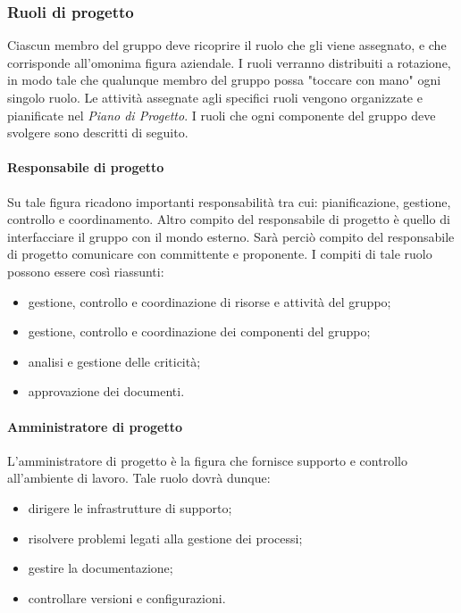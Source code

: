 		\subsubsection{Ruoli di progetto}
		Ciascun membro del gruppo deve ricoprire il ruolo che gli viene assegnato, e che corrisponde all'omonima figura aziendale. I ruoli verranno distribuiti a rotazione, in modo tale che qualunque membro del gruppo possa "toccare con mano" ogni singolo ruolo. Le attività assegnate agli specifici ruoli vengono organizzate e pianificate nel \textit{Piano di Progetto}. I ruoli che ogni componente del gruppo deve svolgere sono descritti di seguito.
		
			\paragraph{Responsabile di progetto}
			Su tale figura ricadono importanti responsabilità tra cui: pianificazione, gestione, controllo e coordinamento. Altro compito del responsabile di progetto è quello di interfacciare il gruppo con il mondo esterno. Sarà perciò compito del responsabile di progetto comunicare con committente e proponente. I compiti di tale ruolo possono essere così riassunti:
			\begin{itemize}
				\item gestione, controllo e coordinazione di risorse e attività del gruppo;
				\item gestione, controllo e coordinazione dei componenti del gruppo;
				\item analisi e gestione delle criticità;
				\item approvazione dei documenti.
			\end{itemize}
		
			\paragraph{Amministratore di progetto}
			L'amministratore di progetto è la figura che fornisce supporto e controllo all'ambiente di lavoro. Tale ruolo dovrà dunque:
			\begin{itemize}
				\item dirigere le infrastrutture di supporto;
				\item risolvere problemi legati alla gestione dei processi;
				\item gestire la documentazione;
				\item controllare versioni e configurazioni.
			\end{itemize}
		
